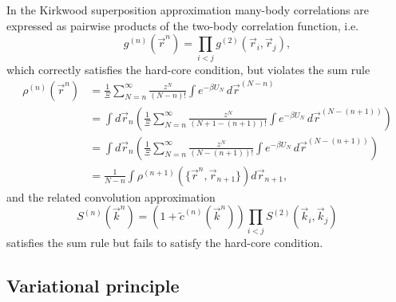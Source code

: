 In the Kirkwood superposition approximation \cite{KirkwoodJCP1935} many-body correlations are expressed as pairwise products of the two-body correlation function, i.e.
\begin{equation}
  g^{(n)}(\vec{r}^n) =
  \prod_{i < j} g^{(2)}(\vec{r}_i, \vec{r}_j),
\end{equation}
which correctly satisfies the hard-core condition, but violates the sum rule
\begin{equation}
  \begin{aligned}
    \rho^{(n)}(\vec{r}^n) &=
    \frac{1}{\Xi} \sum_{N=n}^\infty \frac{z^N}{(N-n)!} \int e^{-\beta U_N} \, d\vec{r}^{(N-n)} \\
    &=
    \int d\vec{r}_n \left(
    \frac{1}{\Xi} \sum_{N=n}^\infty \frac{z^N}{(N+1 - (n+1))!} \int e^{-\beta U_N} \, d\vec{r}^{(N-(n+1))}
    \right) \\
    &=
    \int d\vec{r}_n \left(
    \frac{1}{\Xi} \sum_{N=n}^\infty \frac{z^N}{(N - (n+1))!} \int e^{-\beta U_N} \, d\vec{r}^{(N-(n+1))}
    \right) \\
    &=
    \frac{1}{N-n}
    \int \rho^{(n+1)}(\{\vec{r}^n, \vec{r}_{n+1}\}) d\vec{r}_{n+1},
  \end{aligned}
\end{equation}
and the related convolution approximation \cite{JacksonRMP1962,IchimaruPRA1970,BarratMP1988}%
\begin{equation}
  S^{(n)}(\vec{k}^n) =
  (1 + \tilde{c}^{(n)}(\vec{k}^n))
  \prod_{i < j} S^{(2)}(\vec{k}_i, \vec{k}_j)
\end{equation}
satisfies the sum rule but fails to satisfy the hard-core condition.


\subsection{Variational principle}


